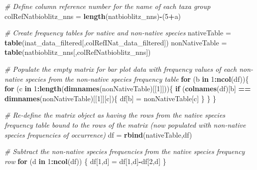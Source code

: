 \documentclass[
  12pt,
]{article}
\newenvironment{Shaded}{\begin{snugshade}}{\end{snugshade}}
\newcommand{\CommentTok}[1]{\textcolor[rgb]{0.56,0.35,0.01}{\textit{#1}}}
\newcommand{\ControlFlowTok}[1]{\textcolor[rgb]{0.13,0.29,0.53}{\textbf{#1}}}
\newcommand{\DecValTok}[1]{\textcolor[rgb]{0.00,0.00,0.81}{#1}}
\newcommand{\FunctionTok}[1]{\textcolor[rgb]{0.13,0.29,0.53}{\textbf{#1}}}
\newcommand{\NormalTok}[1]{#1}
\newcommand{\OtherTok}[1]{\textcolor[rgb]{0.56,0.35,0.01}{#1}}
\newcommand{\SpecialCharTok}[1]{\textcolor[rgb]{0.81,0.36,0.00}{\textbf{#1}}}
\begin{document}
\begin{Shaded}
\begin{Highlighting}[]
  \CommentTok{\# Define column reference number for the name of each taxa group}
\NormalTok{  colRefNatbioblitz\_nns }\OtherTok{=} \FunctionTok{length}\NormalTok{(natbioblitz\_nns)}\SpecialCharTok{{-}}\NormalTok{(}\DecValTok{5}\SpecialCharTok{+}\NormalTok{a)}
  
  \CommentTok{\# Create frequency tables for native and non{-}native species}
\NormalTok{  nativeTable }\OtherTok{=} \FunctionTok{table}\NormalTok{(inat\_data\_filtered[,colRefINat\_data\_filtered])}
\NormalTok{  nonNativeTable }\OtherTok{=} \FunctionTok{table}\NormalTok{(natbioblitz\_nns[,colRefNatbioblitz\_nns])}
  
  \CommentTok{\# Populate the empty matrix for bar plot data with frequency values of each non{-}native species from the non{-}native species frequency table}
  \ControlFlowTok{for}\NormalTok{ (b }\ControlFlowTok{in} \DecValTok{1}\SpecialCharTok{:}\FunctionTok{ncol}\NormalTok{(df))\{}
    \ControlFlowTok{for}\NormalTok{ (c }\ControlFlowTok{in} \DecValTok{1}\SpecialCharTok{:}\FunctionTok{length}\NormalTok{(}\FunctionTok{dimnames}\NormalTok{(nonNativeTable)[[}\DecValTok{1}\NormalTok{]]))\{}
      \ControlFlowTok{if}\NormalTok{ (}\FunctionTok{colnames}\NormalTok{(df)[b] }\SpecialCharTok{==} \FunctionTok{dimnames}\NormalTok{(nonNativeTable)[[}\DecValTok{1}\NormalTok{]][c])\{}
\NormalTok{        df[b] }\OtherTok{=}\NormalTok{ nonNativeTable[c]}
\NormalTok{      \}}
\NormalTok{    \}}
\NormalTok{  \}}
  
  \CommentTok{\# Re{-}define the matrix object as having the rows from the native species frequency table bound to the rows of the matrix (now populated with non{-}native species frequencies of occurrence)}
\NormalTok{  df }\OtherTok{=} \FunctionTok{rbind}\NormalTok{(nativeTable,df)}
  
  \CommentTok{\# Subtract the non{-}native species frequencies from the native species frequency row}
  \ControlFlowTok{for}\NormalTok{ (d }\ControlFlowTok{in} \DecValTok{1}\SpecialCharTok{:}\FunctionTok{ncol}\NormalTok{(df)) \{}
\NormalTok{    df[}\DecValTok{1}\NormalTok{,d] }\OtherTok{=}\NormalTok{ df[}\DecValTok{1}\NormalTok{,d]}\SpecialCharTok{{-}}\NormalTok{df[}\DecValTok{2}\NormalTok{,d]}
\NormalTok{  \}}
  

\end{Highlighting}
\end{Shaded}
\end{document}
